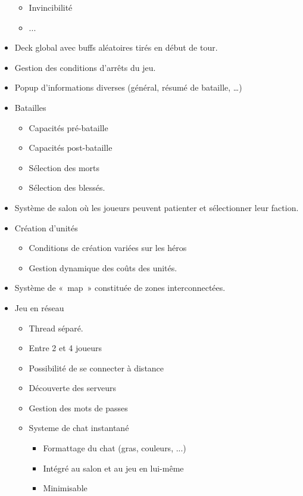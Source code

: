 \begin{itemize}
\begin{itemize}
        \item Invincibilité
        \item ...
    \end{itemize}
    \item Deck global avec buffs aléatoires tirés
        en début de tour.
    \item Gestion des conditions d'arrêts du jeu.
    \item Popup d'informations diverses (général, résumé de bataille, …)
    \item Batailles
    \begin{itemize}
        \item Capacités pré-bataille
        \item Capacités post-bataille
        \item Sélection des morts
        \item Sélection des blessés.
    \end{itemize}
    \item Système de salon où les joueurs peuvent patienter et sélectionner leur faction.
    \item Création d'unités
    \begin{itemize}
        \item Conditions de création variées sur les héros
        \item Gestion dynamique des coûts des unités.
    \end{itemize}
    \item Système de « map » constituée de zones interconnectées.
    \item Jeu en réseau
    \begin{itemize}
        \item Thread séparé.
        \item Entre 2 et 4 joueurs
        \item Possibilité de se connecter à distance
        \item Découverte des serveurs
        \item Gestion des mots de passes
        \item Systeme de chat instantané
        \begin{itemize}
            \item Formattage du chat (gras, couleurs, ...)
            \item Intégré au salon et au jeu en lui-même
            \item Minimisable
        \end{itemize}
    \end{itemize}

\end{itemize}
